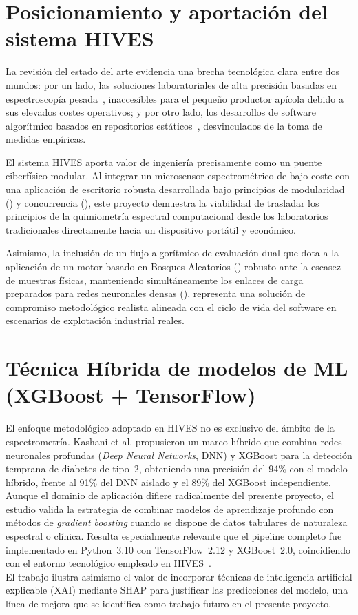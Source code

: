 \section{Posicionamiento y aportación del sistema HIVES}

La revisión del estado del arte evidencia una brecha tecnológica clara entre dos mundos: por un lado, las soluciones laboratoriales de alta precisión basadas en espectroscopía pesada~\cite{guillen2017nirs, sciencedirect_espectro_miel}, inaccesibles para el pequeño productor apícola debido a sus elevados costes operativos; y por otro lado, los desarrollos de software algorítmico basados en repositorios estáticos~\cite{generic_honey_dataset_kaggle}, desvinculados de la toma de medidas empíricas.

El sistema HIVES aporta valor de ingeniería precisamente como un puente ciberfísico modular. Al integrar un microsensor espectrométrico de bajo coste con una aplicación de escritorio robusta desarrollada bajo principios de modularidad () y concurrencia (), este proyecto demuestra la viabilidad de trasladar los principios de la quimiometría espectral computacional desde los laboratorios tradicionales directamente hacia un dispositivo portátil y económico. 

Asimismo, la inclusión de un flujo algorítmico de evaluación dual que dota a la aplicación de un motor basado en Bosques Aleatorios () robusto ante la escasez de muestras físicas, manteniendo simultáneamente los enlaces de carga preparados para redes neuronales densas (), representa una solución de compromiso metodológico realista alineada con el ciclo de vida del software en escenarios de explotación industrial reales.

\section{Técnica Híbrida de modelos de ML (XGBoost + TensorFlow)}

El enfoque metodológico adoptado en HIVES no es exclusivo del ámbito de la espectrometría. Kashani et al. propusieron un marco híbrido que combina redes neuronales profundas (\textit{Deep Neural Networks}, DNN) y XGBoost para la detección temprana de diabetes de tipo~2, obteniendo una precisión del 94\% con el modelo híbrido, frente al 91\% del DNN aislado y el 89\% del XGBoost independiente. Aunque el dominio de aplicación difiere radicalmente del presente proyecto, el estudio valida la estrategia de combinar modelos de aprendizaje profundo con métodos de \textit{gradient boosting} cuando se dispone de datos tabulares de naturaleza espectral o clínica. Resulta especialmente relevante que el pipeline completo fue implementado en Python~3.10 con TensorFlow~2.12 y XGBoost~2.0, coincidiendo con el entorno tecnológico empleado en HIVES~\cite{kashani:2025}. \\

El trabajo ilustra asimismo el valor de incorporar técnicas de inteligencia artificial explicable (XAI) mediante SHAP para justificar las predicciones del modelo, una línea de mejora que se identifica como trabajo futuro en el presente proyecto.